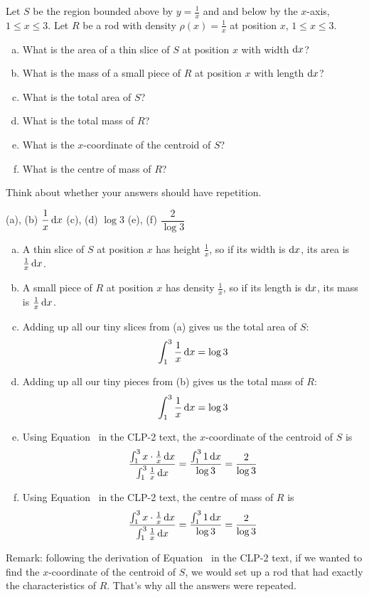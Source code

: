 \begin{question}
Let $S$ be the region bounded above by $y=\frac{1}{x}$ and and below by the $x$-axis, $1 \le x \le 3$. Let $R$ be a rod with density $\rho(x)=\frac{1}{x}$ at position $x$, $1 \le x \le 3$.
\begin{enumerate}[(a)]
\item What is the area of a thin slice of $S$ at position $x$ with width $\mathrm{d}x$?
\item What is the mass of a small piece of $R$ at position $x$ with length $\mathrm{d}x$?
\item What is the total area of $S$?
\item What is the total mass of $R$?
\item What is the $x$-coordinate of the centroid of $S$?
\item What is the centre of mass of $R$?
\end{enumerate}
\end{question}
\begin{hint}
Think about whether your answers should have repetition.
\end{hint}
\begin{answer}
(a), (b) $\dfrac{1}{x}\,\mathrm{d}x$\qquad
(c), (d) $\log 3$\qquad
(e), (f) $\dfrac{2}{\log 3}$
\end{answer}
\begin{solution}
\begin{enumerate}[(a)]
\item A thin slice of $S$ at position $x$ has height $\frac{1}{x}$, so if its width is $\mathrm{d}x$, its area is $\frac{1}{x}\,\mathrm{d}x$.
\item A small piece of $R$ at position $x$ has density $\frac{1}{x}$, so if its length is $\mathrm{d}x$, its mass is $\frac{1}{x}\,\mathrm{d}x$.
\item Adding up all our tiny slices from (a) gives us the total area of $S$:
\[\int_1^3 \frac{1}{x}\,\mathrm{d}x = \log 3\]
\item Adding up all our tiny pieces from (b) gives us the total mass of $R$:
\[\int_1^3 \frac{1}{x}\,\mathrm{d}x=\log 3\]
\item Using Equation~ in the CLP-2 text,
 the $x$-coordinate of the centroid of $S$ is
 \[\frac{\int_1^3 x\cdot\frac{1}{x}\,\mathrm{d}x}{\int_1^3\frac{1}{x}\,\mathrm{d}x} = \frac{\int_1^3 1\,\mathrm{d}x}{\log 3} = \frac{2}{\log 3}\]
\item Using Equation~ in the CLP-2 text,
 the centre of mass of $R$ is
 \[\frac{\int_1^3 x\cdot\frac{1}{x}\,\mathrm{d}x}{\int_1^3\frac{1}{x}\,\mathrm{d}x} = \frac{\int_1^3 1\,\mathrm{d}x}{\log 3} = \frac{2}{\log 3}\]
\end{enumerate}
Remark: following the derivation of Equation~ in the CLP-2 text,
if we wanted to find the $x$-coordinate of the centroid of $S$, we would set up a rod that had exactly the characteristics of $R$. That's why all the answers were repeated.
\end{solution}

